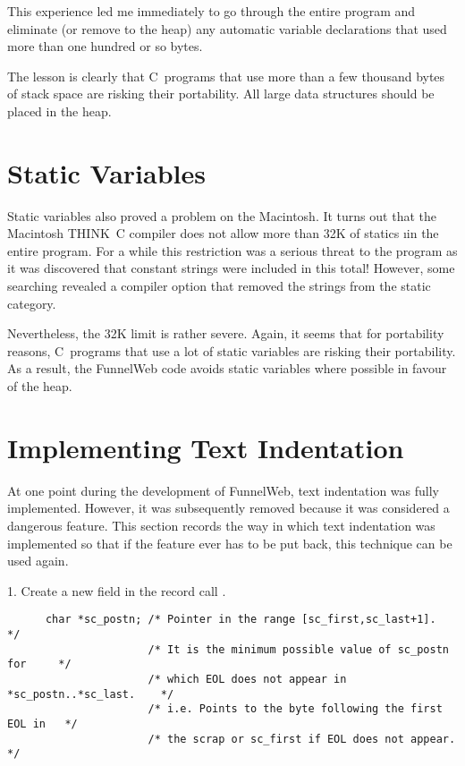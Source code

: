 This experience led me immediately to go through the entire program and
eliminate (or remove to the heap) any automatic variable declarations that
used more than one hundred or so bytes.

The lesson is clearly that C~programs that use more than a few thousand bytes of
stack space are risking their portability. All large data structures should be
placed in the heap.

\section{Static Variables}

Static variables also proved a problem on the Macintosh.
It turns out that
the Macintosh THINK~C compiler
does not allow more than 32K of statics
\i{in the entire program}. For a while this restriction was
a serious threat to the program as it was discovered that constant strings
were included in this total! However, some searching revealed a compiler
option that removed the strings from the static category.

Nevertheless, the 32K limit is rather severe. Again, it seems that for
portability reasons, C~programs that use a lot of static variables are risking
their portability. As a result, the FunnelWeb code avoids static variables
where possible in favour of the heap.

\section{Implementing Text Indentation}

At one point during the development of FunnelWeb, text indentation was
fully implemented. However, it was subsequently removed because it was
considered a dangerous feature. This section records the way in which
text indentation was implemented so that if the feature ever has to be put
back, this technique can be used again.


1. Create a new field in the  record call .

\begin{verbatim}
      char *sc_postn; /* Pointer in the range [sc_first,sc_last+1].           */
                      /* It is the minimum possible value of sc_postn for     */
                      /* which EOL does not appear in *sc_postn..*sc_last.    */
                      /* i.e. Points to the byte following the first EOL in   */
                      /* the scrap or sc_first if EOL does not appear.        */
\end{verbatim}

